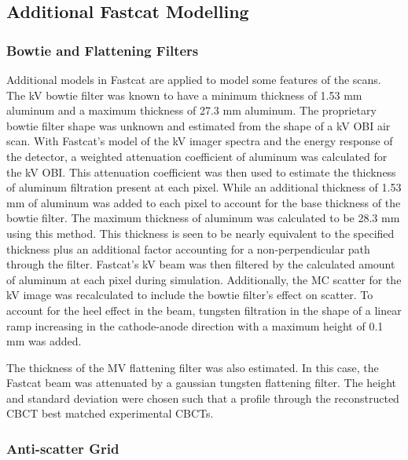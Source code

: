 \subsection{Additional Fastcat Modelling}

\subsubsection{Bowtie and Flattening Filters}

Additional models in Fastcat are applied to model some features of the scans. The kV bowtie filter was known to have a minimum thickness of 1.53 mm aluminum and a maximum thickness of 27.3 mm aluminum. The proprietary bowtie filter shape was unknown and estimated from the shape of a kV OBI air scan. With Fastcat’s model of the kV imager spectra and the energy response of the detector, a weighted attenuation coefficient of aluminum was calculated for the kV OBI. This attenuation coefficient was then used to estimate the thickness of aluminum filtration present at each pixel. While an additional thickness of 1.53 mm of aluminum was added to each pixel to account for the base thickness of the bowtie filter. The maximum thickness of aluminum was calculated to be 28.3 mm using this method. This thickness is seen to be nearly equivalent to the specified thickness plus an additional factor accounting for a non-perpendicular path through the filter. Fastcat’s kV beam was then filtered by the calculated amount of aluminum at each pixel during simulation. Additionally, the MC scatter for the kV image was recalculated to include the bowtie filter’s effect on scatter. To account for the heel effect in the beam, tungsten filtration in the shape of a linear ramp increasing in the cathode-anode direction with a maximum height of 0.1 mm was added.

The thickness of the MV flattening filter was also estimated. In this case, the Fastcat beam was attenuated by a gaussian tungsten flattening filter. The height and standard deviation were chosen such that a profile through the reconstructed CBCT best matched experimental CBCTs.

\subsubsection{Anti-scatter Grid}

